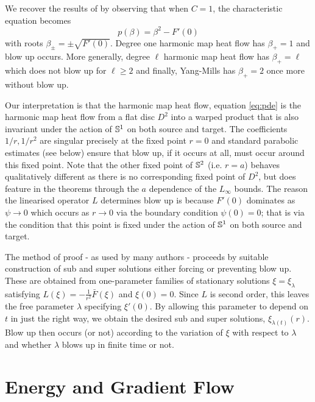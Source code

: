 \documentclass{amsart}
\begin{document}
\begin{rem}
We recover the results of \cite{MR2332425} by observing that when \(C = 1\), the characteristic equation becomes
\[
p(\beta) = \beta^2 - F'(0)
\]
with roots \(\beta_{\pm} = \pm \sqrt{F'(0)}\). Degree one harmonic map heat flow has \(\beta_+ = 1\) and blow up occurs. More generally, degree \(\ell\) harmonic map heat flow has \(\beta_+ = \ell\) which does not blow up for \(\ell \geq 2\) and finally, Yang-Mills has \(\beta_+ = 2\) once more without blow up.
\end{rem}

Our interpretation is that the harmonic map heat flow, equation \eqref{eq:pde} is the harmonic map heat flow from a flat disc \(D^2\) into a warped product that is also invariant under the action of \(\S^1\) on both source and target. The coefficients \(1/r, 1/r^2\) are singular precisely at the fixed point \(r = 0\) and standard parabolic estimates (see  below) ensure that blow up, if it occurs at all, must occur around this fixed point. Note that the other fixed point of \(\S^2\) (i.e. \(r=a\)) behaves qualitatively different as there is no corresponding fixed point of \(D^2\), but does feature in the theorems through the \(a\) dependence of the \(L_{\infty}\) bounds. The reason the linearised operator \(L\) determines blow up is because \(F'(0)\) dominates as \(\psi \to 0\) which occurs as \(r \to 0\) via the boundary condition \(\psi(0) = 0\); that is via the condition that this point is fixed under the action of \(\S^1\) on both source and target.


The method of proof - as used by many authors \cite{MR2332425,MR1180392} - proceeds by suitable construction of sub and super solutions either forcing or preventing blow up. These are obtained from one-parameter families of stationary solutions \(\xi = \xi_{\lambda}\) satisfying \(L(\xi) = -\tfrac{1}{r^2} \bar{F} (\xi)\) and \(\xi(0) = 0\). Since \(L\) is second order, this leaves the free parameter \(\lambda\) specifying \(\xi'(0)\). By allowing this parameter to depend on \(t\) in just the right way, we obtain the desired sub and super solutions, \(\xi_{\lambda(t)} (r)\). Blow up then occurs (or not) according to the variation of \(\xi\) with respect to \(\lambda\) and whether \(\lambda\) blows up in finite time or not.


\section{Energy and Gradient Flow}
\label{subsec:intro_energygradient}
\end{document}

